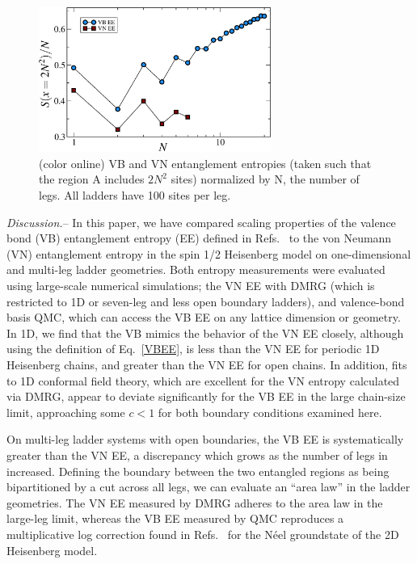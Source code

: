 \documentclass[prl,aps,twocolumn,floatfix,amsmath,amssymb,superscriptaddress,tightenlines]{revtex4}
\begin{document}
\begin{figure} { \includegraphics[width=3in]{fig4.eps} \caption{(color
online) VB and VN entanglement entropies (taken such that the region A
includes $2N^2$ sites) normalized by N, the number of legs.  All ladders
have 100 sites per leg.  \label{zigzag}}} \end{figure}

{\it Discussion.}-- In this paper, we have compared scaling properties of
the valence bond (VB) entanglement entropy (EE) defined in
Refs.~\cite{Alet,Chh} to the von Neumann (VN) entanglement entropy in the
spin 1/2 Heisenberg model on one-dimensional and multi-leg ladder
geometries.  Both entropy measurements were evaluated using large-scale
numerical simulations; the VN EE with DMRG (which is restricted to 1D or
seven-leg and less open boundary ladders), and valence-bond basis QMC,
which can access the VB EE on any lattice dimension or geometry.  In 1D,
we find that the VB mimics the behavior of the VN EE closely, although
using the definition of Eq.~\eqref{VBEE}, is less than the VN EE for
periodic 1D Heisenberg chains, and greater than the VN EE for open chains.
In addition, fits to 1D conformal field theory, which are excellent for
the VN entropy calculated via DMRG, appear to deviate significantly for
the VB EE in the large chain-size limit, approaching some $c<1$ for both
boundary conditions examined here.

On multi-leg ladder systems with open boundaries, the VB EE is
systematically greater than the VN EE, a discrepancy which grows as the
number of legs in increased.  Defining the boundary between the two
entangled regions as being bipartitioned by a cut across all legs, we can
evaluate an ``area law'' in the ladder geometries.  The VN EE measured by
DMRG adheres to the area law in the large-leg limit, whereas the VB EE
measured by QMC reproduces a multiplicative log correction found in
Refs.~\cite{Alet,Chh} for the N\'eel groundstate of the 2D Heisenberg
model.
\end{document}
